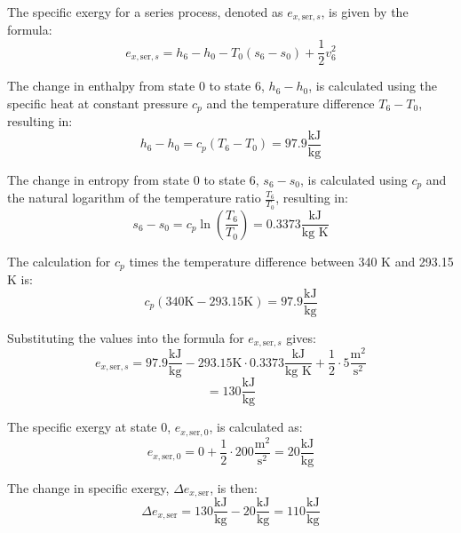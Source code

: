 The specific exergy for a series process, denoted as \( e_{x, \text{ser}, s} \), is given by the formula:
\[ e_{x, \text{ser}, s} = h_6 - h_0 - T_0 (s_6 - s_0) + \frac{1}{2} v_6^2 \]

The change in enthalpy from state 0 to state 6, \( h_6 - h_0 \), is calculated using the specific heat at constant pressure \( c_p \) and the temperature difference \( T_6 - T_0 \), resulting in:
\[ h_6 - h_0 = c_p (T_6 - T_0) = 97.9 \frac{\text{kJ}}{\text{kg}} \]

The change in entropy from state 0 to state 6, \( s_6 - s_0 \), is calculated using \( c_p \) and the natural logarithm of the temperature ratio \( \frac{T_6}{T_0} \), resulting in:
\[ s_6 - s_0 = c_p \ln \left( \frac{T_6}{T_0} \right) = 0.3373 \frac{\text{kJ}}{\text{kg K}} \]

The calculation for \( c_p \) times the temperature difference between 340 K and 293.15 K is:
\[ c_p (340 \text{K} - 293.15 \text{K}) = 97.9 \frac{\text{kJ}}{\text{kg}} \]

Substituting the values into the formula for \( e_{x, \text{ser}, s} \) gives:
\[ e_{x, \text{ser}, s} = 97.9 \frac{\text{kJ}}{\text{kg}} - 293.15 \text{K} \cdot 0.3373 \frac{\text{kJ}}{\text{kg K}} + \frac{1}{2} \cdot 5 \frac{\text{m}^2}{\text{s}^2} \]
\[ = 130 \frac{\text{kJ}}{\text{kg}} \]

The specific exergy at state 0, \( e_{x, \text{ser}, 0} \), is calculated as:
\[ e_{x, \text{ser}, 0} = 0 + \frac{1}{2} \cdot 200 \frac{\text{m}^2}{\text{s}^2} = 20 \frac{\text{kJ}}{\text{kg}} \]

The change in specific exergy, \( \Delta e_{x, \text{ser}} \), is then:
\[ \Delta e_{x, \text{ser}} = 130 \frac{\text{kJ}}{\text{kg}} - 20 \frac{\text{kJ}}{\text{kg}} = 110 \frac{\text{kJ}}{\text{kg}} \]
